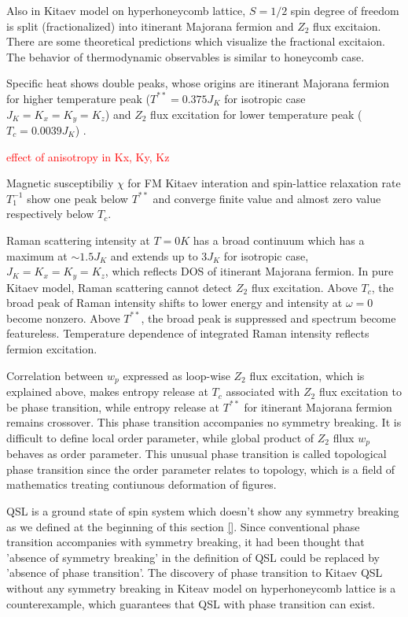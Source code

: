 Also in Kitaev model on hyperhoneycomb lattice, $S = 1/2$ spin degree of freedom is split (fractionalized) into itinerant Majorana fermion and $Z_2$ flux excitaion.
There are some theoretical predictions which visualize the fractional excitaion.
The behavior of thermodynamic observables is similar to honeycomb case.

Specific heat shows double peaks, whose origins are itinerant Majorana fermion for higher temperature peak ($T^{**} = 0.375J_K$ for isotropic case $J_K = K_x = K_y = K_z$) and $Z_2$ flux excitation for lower temperature peak ($T_c = 0.0039J_K$) \cite{nasu2014vaporization}.

\textcolor{red}{effect of anisotropy in Kx, Ky, Kz}

Magnetic susceptibiliy $\chi$ for FM Kitaev interation and spin-lattice relaxation rate $T^{-1}_1$ show one peak below $T^{**}$ and converge finite value and almost zero value respectively below $T_c$.

Raman scattering intensity at $T = 0 K$ has a broad continuum which has a maximum at $\sim 1.5J_K$ and extends up to $3J_K$ for isotropic case, $J_K = K_x = K_y = K_z$, which reflects DOS of itinerant Majorana fermion.
In pure Kitaev model, Raman scattering cannot detect $Z_2$ flux excitation.
Above $T_c$, the broad peak of Raman intensity shifts to lower energy and intensity at $\omega = 0$ become nonzero.
Above $T^{**}$, the broad peak is suppressed and spectrum become featureless.
Temperature dependence of integrated Raman intensity reflects fermion excitation.

Correlation between $w_p$ expressed as loop-wise $Z_2$ flux excitation, which is explained above, makes entropy release at $T_c$ associated with $Z_2$ flux excitation to be phase transition, while entropy release at $T^{**}$ for itinerant Majorana fermion remains crossover.
This phase transition accompanies no symmetry breaking.
It is difficult to define local order parameter, while global product of $Z_2$ fllux $w_p$ behaves as order parameter.
This unusual phase transition is called topological phase transition since the order parameter relates to topology, which is a field of mathematics treating contiunous deformation of figures.

QSL is a ground state of spin system which doesn't show any symmetry breaking as we defined at the beginning of this section \ref{}.
Since conventional phase transition accompanies with symmetry breaking, it had been thought that 'absence of symmetry breaking' in the definition of QSL could be replaced by 'absence of phase transition'.
The discovery of phase transition to Kitaev QSL without any symmetry breaking in Kiteav model on hyperhoneycomb lattice is a counterexample, which guarantees that QSL with phase transition
can exist.

